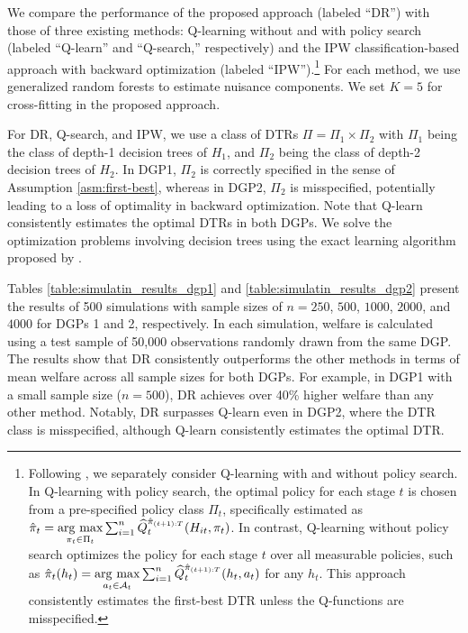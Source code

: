 We compare the performance of the proposed approach (labeled ``DR'') with those of three existing methods:  Q-learning without and with policy search (labeled ``Q-learn'' and ``Q-search,'' respectively) and the IPW classification-based approach with backward optimization (labeled ``IPW'').\footnote{Following \cite{Murphy_2005}, we separately consider Q-learning with and without policy search. In Q-learning with policy search, the optimal policy for each stage $t$ is chosen from a pre-specified policy class $\Pi_t$, specifically estimated as $\hat{\pi}_{t} = \mathop{\rm arg~max}\limits_{\pi_{t}\in \Pi_{t}}\sum_{i=1}^{n}\widehat{Q}_{t}^{\hat{\pi}_{(t+1):T}}(H_{it},\pi_{t})$. 
In contrast, Q-learning without policy search optimizes the policy for each stage $t$ over all measurable policies, such as $\hat{\pi}_{t}(h_t) = \mathop{\rm arg~max}\limits_{a_{t}\in \mathcal{A}_{t}}\sum_{i=1}^{n}\widehat{Q}_{t}^{\hat{\pi}_{(t+1):T}}(h_{t},a_{t})$ for any $h_t$. This approach consistently estimates the first-best DTR unless the Q-functions are misspecified.}
For each method, we use generalized random forests \citep{Athey_et_al_2019} to estimate nuisance components. We set $K=5$ for cross-fitting in the proposed approach.



For DR, Q-search, and IPW, we use a class of DTRs $\Pi=\Pi_{1} \times \Pi_{2}$ with $\Pi_1$ being the class of depth-1 decision trees of $H_1$, and $\Pi_2$ being the class of depth-2 decision trees of $H_2$. In DGP1, $\Pi_2$ is correctly specified in the sense of Assumption \ref{asm:first-best}, whereas in DGP2, $\Pi_2$ is misspecified, potentially leading to a loss of optimality in backward optimization. Note that Q-learn consistently estimates the optimal DTRs in both DGPs. We solve the optimization problems involving decision trees using the exact learning algorithm proposed by \cite{zhou2022offline}.







Tables \ref{table:simulatin_results_dgp1} and \ref{table:simulatin_results_dgp2} present the results of 500 simulations with sample sizes of $n = 250$, $500$, $1000$, $2000$, and $4000$ for DGPs 1 and 2, respectively. In each simulation, welfare is calculated using a test sample of 50,000 observations randomly drawn from the same DGP. The results show that DR consistently outperforms the other methods in terms of mean welfare across all sample sizes for both DGPs. For example, in DGP1 with a small sample size ($n=500$), DR achieves over 40\% higher welfare than any other method. Notably, DR surpasses Q-learn even in DGP2, where the DTR class is misspecified, although Q-learn consistently estimates the optimal DTR.



